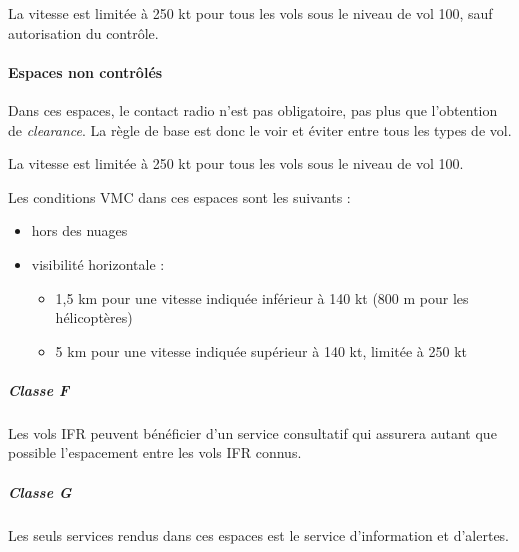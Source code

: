 		
		
		La vitesse est limitée à 250 kt pour tous les vols sous le niveau de vol 100, sauf autorisation du contrôle.
		
		\paragraph{Espaces non contrôlés}
		Dans ces espaces, le contact radio n'est pas obligatoire, pas plus que l'obtention de \textit{clearance}. La règle de base est donc le voir et éviter entre tous les types de vol.
				
				
		La vitesse est limitée à 250 kt pour tous les vols sous le niveau de vol 100.
		
		Les conditions VMC dans ces espaces sont les suivants :
		\begin{itemize}
			\item hors des nuages
			\item visibilité horizontale :
			\begin{itemize}
				\item 1,5 km pour une vitesse indiquée inférieur à 140 kt (800 m pour les hélicoptères)
				\item 5 km pour une vitesse indiquée supérieur à 140 kt, limitée à 250 kt
			\end{itemize}
		\end{itemize}
		
		\subparagraph{Classe F}
		Les vols IFR peuvent bénéficier d'un service consultatif qui assurera autant que possible l'espacement entre les vols IFR connus. 
		
		
		\subparagraph{Classe G}
		Les seuls services rendus dans ces espaces est le service d'information et d'alertes.
		
		
